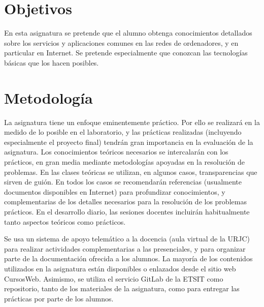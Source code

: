 \documentclass[a4paper,12pt]{article}
\begin{document}
\newpage

\section{Objetivos}

En esta asignatura se pretende que el alumno obtenga conocimientos detallados sobre los servicios y aplicaciones comunes en las redes de ordenadores, y en particular en Internet. Se pretende especialmente que conozcan las tecnologías básicas que los hacen posibles.

\section{Metodología}

La asignatura tiene un enfoque eminentemente práctico. Por ello se realizará en la medido de lo posible en el laboratorio, y las prácticas realizadas (incluyendo especialmente el proyecto final) tendrán gran importancia en la evaluación de la asignatura. Los conocimientos teóricos necesarios se intercalarán con los prácticos, en gran media mediante metodologías apoyadas en la resolución de problemas. En las clases teóricas se utilizan, en algunos casos, transparencias que sirven de guión. En todos los casos se recomendarán referencias (usualmente documentos disponibles en Internet) para profundizar conocimientos, y complementarias de los detalles necesarios para la resolución de los problemas prácticos. En el desarrollo diario, las sesiones docentes incluirán habitualmente tanto aspectos teóricos como prácticos.

Se usa un sistema de apoyo telemático a la docencia (aula virtual de la URJC) para realizar actividades complementarias a las presenciales, y para organizar parte de la documentación ofrecida a los alumnos. La mayoría de los contenidos utilizados en la asignatura están disponibles o enlazados desde el sitio web CursosWeb. Asimismo, se utiliza el servicio GitLab de la ETSIT como repositorio, tanto de los materiales de la asignatura, como para entregar las prácticas por parte de los alumnos.

\newpage

\end{document}

